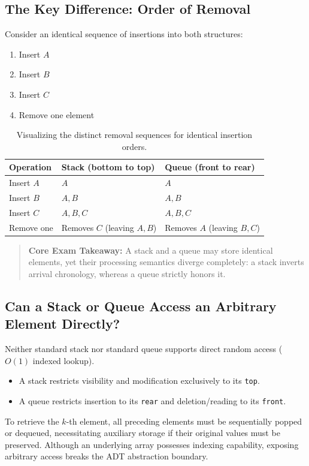 \subsection{The Key Difference: Order of Removal}

Consider an identical sequence of insertions into both structures:
\begin{enumerate}
    \item Insert $A$
    \item Insert $B$
    \item Insert $C$
    \item Remove one element
\end{enumerate}

\begin{table}[htbp]
\centering
\small
\begin{tabularx}{0.85\textwidth}{l X X}
\toprule
\textbf{Operation} & \textbf{Stack (bottom to top)} & \textbf{Queue (front to rear)} \\
\midrule
Insert $A$ & $A$       & $A$ \\
Insert $B$ & $A, B$    & $A, B$ \\
Insert $C$ & $A, B, C$ & $A, B, C$ \\
Remove one & Removes $C$ (leaving $A, B$) & Removes $A$ (leaving $B, C$) \\
\bottomrule
\end{tabularx}
\caption{Visualizing the distinct removal sequences for identical insertion orders.}
\end{table}

\begin{quote}
\textbf{Core Exam Takeaway:} A stack and a queue may store identical elements, yet their processing semantics diverge completely: a stack inverts arrival chronology, whereas a queue strictly honors it.
\end{quote}

\subsection{Can a Stack or Queue Access an Arbitrary Element Directly?}

Neither standard stack nor standard queue supports direct random access ($O(1)$ indexed lookup). 
\begin{itemize}
    \item A stack restricts visibility and modification exclusively to its \texttt{top}.
    \item A queue restricts insertion to its \texttt{rear} and deletion/reading to its \texttt{front}.
\end{itemize}
To retrieve the $k$-th element, all preceding elements must be sequentially popped or dequeued, necessitating auxiliary storage if their original values must be preserved. Although an underlying array possesses indexing capability, exposing arbitrary access breaks the ADT abstraction boundary.

